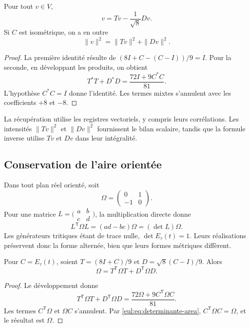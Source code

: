 \begin{proposicion}
\label{eul:prop:recuperacion}
Pour tout \(v\in V\),
\begin{equation}
 v=Tv-\frac1{\sqrt8}Dv.
\label{eul:eq:recuperacion}
\end{equation}
Si \(C\) est isométrique, on a en outre
\[
 \|v\|^2=\|Tv\|^2+\|Dv\|^2.
\]
\end{proposicion}
\begin{proof}
La première identité résulte de
\((8I+C-(C-I))/9=I\). Pour la seconde, en développant les produits,
on obtient
\[
 T^*T+D^*D=\frac{72I+9C^*C}{81}.
\]
L'hypothèse \(C^*C=I\) donne l'identité. Les termes mixtes s'annulent avec les coefficients \(+8\) et \(-8\).
\end{proof}

La récupération utilise les registres vectoriels, y compris leurs corrélations. Les intensités \(\|Tv\|^2\) et \(\|Dv\|^2\) fournissent le bilan scalaire, tandis que la formule inverse utilise \(Tv\) et \(Dv\) dans leur intégralité.

\subsection{Conservation de l'aire orientée}
\label{eul:area}

Dans tout plan réel orienté, soit
\[
 \Omega=\begin{pmatrix}0&1\\-1&0\end{pmatrix}.
\]
Pour une matrice \(L=\bigl(\begin{smallmatrix}a&b\\c&d\end{smallmatrix}\bigr)\), la multiplication directe donne
\begin{equation}
 L^\mathsf T\Omega L=(ad-bc)\Omega=(\det L)\Omega.
\label{eul:eq:determinante-area}
\end{equation}
Les générateurs tritiques étant de trace nulle, \(\det E_\tau(t)=1\). Leurs réalisations préservent donc la forme alternée, bien que leurs formes métriques diffèrent.

\begin{teorema}
\label{eul:teo:area} Pour \(C=E_\tau(t)\), soient \(T=(8I+C)/9\) et \(D=\sqrt8(C-I)/9\). Alors
\begin{equation}
 \Omega=T^\mathsf T\Omega T+D^\mathsf T\Omega D.
\label{eul:eq:balance-area}
\end{equation}
\end{teorema}
\begin{proof}
Le développement donne
\[
 T^\mathsf T\Omega T+D^\mathsf T\Omega D
 =\frac{72\Omega+9C^\mathsf T\Omega C}{81}.
\]
Les termes \(C^\mathsf T\Omega\) et \(\Omega C\) s'annulent. Par \eqref{eul:eq:determinante-area}, \(C^\mathsf T\Omega C=\Omega\), et le résultat est \(\Omega\).
\end{proof}

